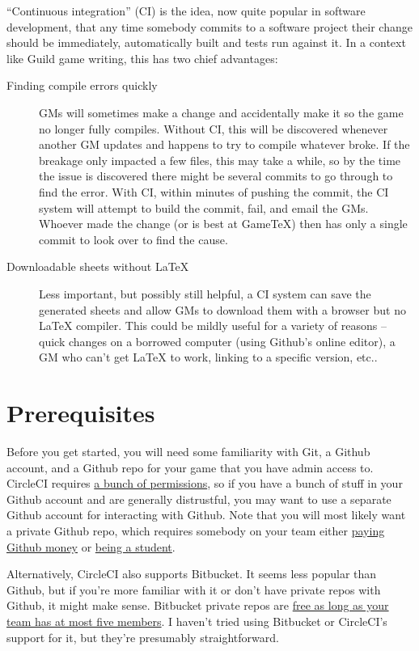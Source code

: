\documentclass[green]{testgame}
\begin{document}
``Continuous integration'' (CI) is the idea, now quite popular in software development, that any time somebody commits to a software project their change should be immediately, automatically built and tests run against it. In a context like Guild game writing, this has two chief advantages:
\begin{description}
\item[Finding compile errors quickly] GMs will sometimes make a change and accidentally make it so the game no longer fully compiles. Without CI, this will be discovered whenever another GM updates and happens to try to compile whatever broke. If the breakage only impacted a few files, this may take a while, so by the time the issue is discovered there might be several commits to go through to find the error. With CI, within minutes of pushing the commit, the CI system will attempt to build the commit, fail, and email the GMs. Whoever made the change (or is best at GameTeX) then has only a single commit to look over to find the cause.
\item[Downloadable sheets without \LaTeX] Less important, but possibly still helpful, a CI system can save the generated sheets and allow GMs to download them with a browser but no \LaTeX{} compiler. This could be mildly useful for a variety of reasons -- quick changes on a borrowed computer (using Github's online editor), a GM who can't get \LaTeX{} to work, linking to a specific version, etc..
\end{description}

\section{Prerequisites}
\label{sec:prereqs}

Before you get started, you will need some familiarity with Git, a Github account, and a Github repo for your game that you have admin access to. CircleCI requires \href{https://circleci.com/docs/github-permissions/}{a bunch of permissions}, so if you have a bunch of stuff in your Github account and are generally distrustful, you may want to use a separate Github account for interacting with Github. Note that you will most likely want a private Github repo, which requires somebody on your team either \href{https://github.com/pricing}{paying Github money} or \href{https://education.github.com/pack}{being a student}.

Alternatively, CircleCI also supports Bitbucket. It seems less popular than Github, but if you're more familiar with it or don't have private repos with Github, it might make sense. Bitbucket private repos are \href{https://bitbucket.org/product/pricing?tab=host-in-the-cloud}{free as long as your team has at most five members}. I haven't tried using Bitbucket or CircleCI's support for it, but they're presumably straightforward.
\end{document}
